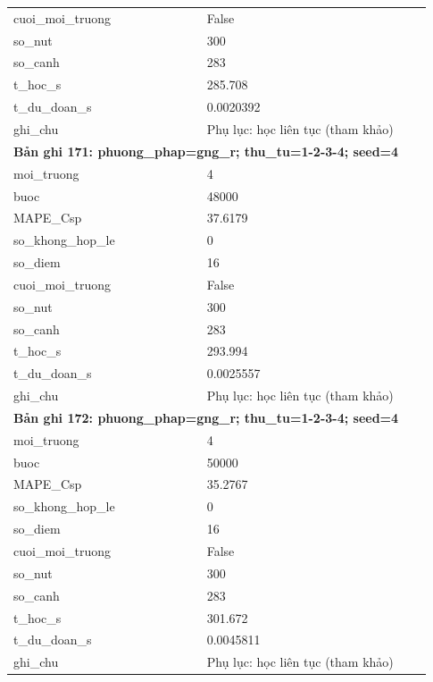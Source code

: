 \begin{longtable}{p{0.43\linewidth}p{0.50\linewidth}}
cuoi\_\allowbreak moi\_\allowbreak truong & False \\
so\_\allowbreak nut & 300 \\
so\_\allowbreak canh & 283 \\
t\_\allowbreak hoc\_\allowbreak s & 285.708 \\
t\_\allowbreak du\_\allowbreak doan\_\allowbreak s & 0.0020392 \\
ghi\_\allowbreak chu & Phụ lục: học liên tục (tham khảo) \\
\midrule
\multicolumn{2}{p{0.95\linewidth}}{\textbf{Bản ghi 171: phuong\_phap=gng\_r; thu\_tu=1-2-3-4; seed=4}} \\
moi\_\allowbreak truong & 4 \\
buoc & 48000 \\
MAPE\_\allowbreak Csp & 37.6179 \\
so\_\allowbreak khong\_\allowbreak hop\_\allowbreak le & 0 \\
so\_\allowbreak diem & 16 \\
cuoi\_\allowbreak moi\_\allowbreak truong & False \\
so\_\allowbreak nut & 300 \\
so\_\allowbreak canh & 283 \\
t\_\allowbreak hoc\_\allowbreak s & 293.994 \\
t\_\allowbreak du\_\allowbreak doan\_\allowbreak s & 0.0025557 \\
ghi\_\allowbreak chu & Phụ lục: học liên tục (tham khảo) \\
\midrule
\multicolumn{2}{p{0.95\linewidth}}{\textbf{Bản ghi 172: phuong\_phap=gng\_r; thu\_tu=1-2-3-4; seed=4}} \\
moi\_\allowbreak truong & 4 \\
buoc & 50000 \\
MAPE\_\allowbreak Csp & 35.2767 \\
so\_\allowbreak khong\_\allowbreak hop\_\allowbreak le & 0 \\
so\_\allowbreak diem & 16 \\
cuoi\_\allowbreak moi\_\allowbreak truong & False \\
so\_\allowbreak nut & 300 \\
so\_\allowbreak canh & 283 \\
t\_\allowbreak hoc\_\allowbreak s & 301.672 \\
t\_\allowbreak du\_\allowbreak doan\_\allowbreak s & 0.0045811 \\
ghi\_\allowbreak chu & Phụ lục: học liên tục (tham khảo) \\

\end{longtable}
